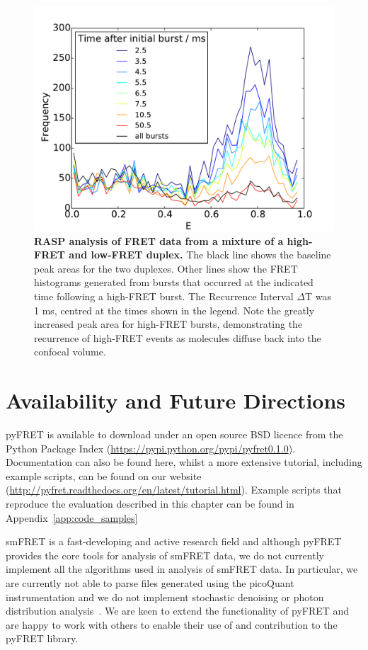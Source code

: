 \begin{figure}[!ht]
   \begin{center}
      \includegraphics*[clip=true, width=6in]{pyFRET/RASP_performance.pdf}
      \caption{{\bf RASP analysis of FRET data from a mixture of a high-FRET and low-FRET duplex.} The black line shows the baseline peak areas for the two duplexes. Other lines show the FRET histograms generated from bursts that occurred at the indicated time following a high-FRET burst. The Recurrence Interval $\Delta$T was 1 ms, centred at the times shown in the legend. Note the greatly increased peak area for high-FRET bursts, demonstrating the recurrence of high-FRET events as molecules diffuse back into the confocal volume.}
      \label{fig:fig9_RASP}
   \end{center}
\end{figure}

\section{Availability and Future Directions}
\label{sect:availability}
pyFRET is available to download under an open source BSD licence from the Python Package Index (\url{https://pypi.python.org/pypi/pyfret0.1.0}). Documentation can also be found here, whilst a more extensive tutorial, including example scripts, can be found on our website (\url{http://pyfret.readthedocs.org/en/latest/tutorial.html}). Example scripts that reproduce the evaluation described in this chapter can be found in Appendix~\ref{app:code_samples}

smFRET is a fast-developing and active research field and although pyFRET provides the core tools for analysis of smFRET data, we do not currently implement all the algorithms used in analysis of smFRET data. In particular, we are currently not able to parse files generated using the picoQuant instrumentation and we do not implement stochastic denoising or photon distribution analysis~\cite{kalinin2007, antonik2006, santoso10, torella11}. We are keen to extend the functionality of pyFRET and are happy to work with others to enable their use of and contribution to the pyFRET library.

